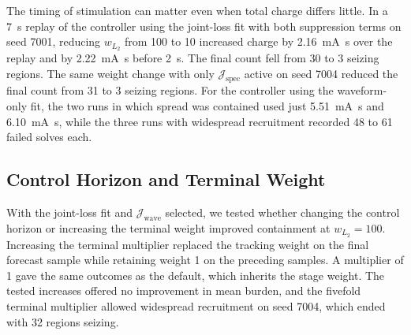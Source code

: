The timing of stimulation can matter even when total charge differs little.
In a \SI{7}{\second} replay of the controller using the joint-loss fit with both suppression terms on seed 7001, reducing \(w_{L_2}\) from 100 to 10 increased charge by \SI{2.16}{\milli\ampere\second} over the replay and by \SI{2.22}{\milli\ampere\second} before \SI{2}{\second}.
The final count fell from 30 to 3 seizing regions.
The same weight change with only \(\mathcal J_{\mathrm{spec}}\) active on seed 7004 reduced the final count from 31 to 3 seizing regions.
For the controller using the waveform-only fit, the two runs in which spread was contained used just \SI{5.51}{\milli\ampere\second} and \SI{6.10}{\milli\ampere\second}, while the three runs with widespread recruitment recorded 48 to 61 failed solves each.

\FloatBarrier
\subsection{Control Horizon and Terminal Weight}

With the joint-loss fit and \(\mathcal J_{\mathrm{wave}}\) selected, we tested whether changing the control horizon or increasing the terminal weight improved containment at \(w_{L_2}=100\).
Increasing the terminal multiplier replaced the tracking weight on the final forecast sample while retaining weight 1 on the preceding samples.
A multiplier of 1 gave the same outcomes as the default, which inherits the stage weight.
The tested increases offered no improvement in mean burden, and the fivefold terminal multiplier allowed widespread recruitment on seed 7004, which ended with 32 regions seizing.

